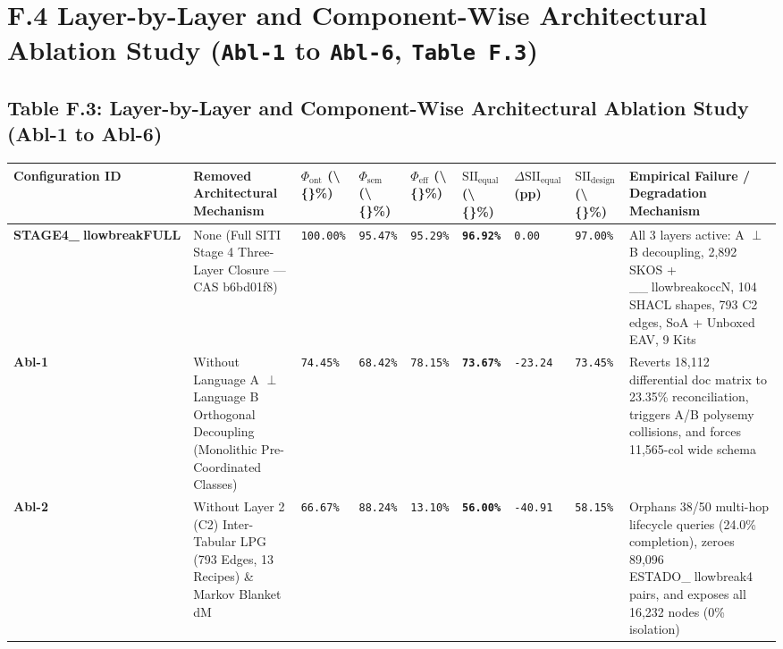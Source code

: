 \documentclass[10pt,a4paper]{article}
\begin{document}
\section*{F.4 Layer-by-Layer and Component-Wise Architectural Ablation Study (\texttt{Abl-1} to \texttt{Abl-6}, \texttt{Table F.3})}

\subsection*{Table F.3: Layer-by-Layer and Component-Wise Architectural Ablation Study (Abl-1 to Abl-6)}

{\scriptsize
\begin{longtable}{p{}p{}p{}p{}p{}p{}p{}p{}p{}}
\toprule
\textbf{Configuration ID} & \textbf{Removed Architectural Mechanism} & \textbf{$\Phi_{\text{ont}}$ (\textbackslash\{\}\%)} & \textbf{$\Phi_{\text{sem}}$ (\textbackslash\{\}\%)} & \textbf{$\Phi_{\text{eff}}$ (\textbackslash\{\}\%)} & \textbf{$\text{SII}_{\text{equal}}$ (\textbackslash\{\}\%)} & \textbf{$\Delta\text{SII}_{\text{equal}}$ (pp)} & \textbf{$\text{SII}_{\text{design}}$ (\textbackslash\{\}\%)} & \textbf{Empirical Failure / Degradation Mechanism} \\
\midrule
\endhead
\textbf{STAGE4\_llowbreak{}FULL} & None (Full SITI Stage 4 Three-Layer Closure --- CAS b6bd01f8) & \texttt{100.00\%} & \texttt{95.47\%} & \texttt{95.29\%} & \textbf{\texttt{96.92\%}} & \texttt{0.00} & \texttt{97.00\%} & All 3 layers active: A $\perp$ B decoupling, 2,892 SKOS + \_\_llowbreak{}occN, 104 SHACL shapes, 793 C2 edges, SoA + Unboxed EAV, 9 Kits \\
\textbf{Abl-1} & Without Language A $\perp$ Language B Orthogonal Decoupling (Monolithic Pre-Coordinated Classes) & \texttt{74.45\%} & \texttt{68.42\%} & \texttt{78.15\%} & \textbf{\texttt{73.67\%}} & \texttt{-23.24} & \texttt{73.45\%} & Reverts 18,112 differential doc matrix to 23.35\% reconciliation, triggers A/B polysemy collisions, and forces 11,565-col wide schema \\
\textbf{Abl-2} & Without Layer 2 (C2) Inter-Tabular LPG (793 Edges, 13 Recipes) \& Markov Blanket dM & \texttt{66.67\%} & \texttt{88.24\%} & \texttt{13.10\%} & \textbf{\texttt{56.00\%}} & \texttt{-40.91} & \texttt{58.15\%} & Orphans 38/50 multi-hop lifecycle queries (24.0\% completion), zeroes 89,096 ESTADO\_llowbreak{}4 pairs, and exposes all 16,232 nodes (0\% isolation) \\

\end{longtable}}
\end{document}
